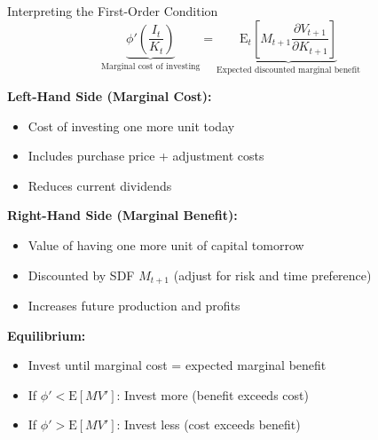 \documentclass{beamer}
\begin{document}
\begin{frame}[allowframebreaks]{Interpreting the First-Order Condition}
    \begin{equation*}
        \underbrace{\phi'\left(\frac{I_t}{K_t}\right)}_{\text{Marginal cost of investing}} = \underbrace{\mathrm{E}_t\left[M_{t+1} \frac{\partial V_{t+1}}{\partial K_{t+1}}\right]}_{\text{Expected discounted marginal benefit}}
    \end{equation*}
    
    
    \textbf{Left-Hand Side (Marginal Cost):}
    \begin{itemize}
        \item Cost of investing one more unit today
        \item Includes purchase price + adjustment costs
        \item Reduces current dividends
    \end{itemize}
    
    
    \textbf{Right-Hand Side (Marginal Benefit):}
    \begin{itemize}
        \item Value of having one more unit of capital tomorrow
        \item Discounted by SDF $M_{t+1}$ (adjust for risk and time preference)
        \item Increases future production and profits
    \end{itemize}
    
    
    \textbf{Equilibrium:}
    \begin{itemize}
        \item Invest until marginal cost = expected marginal benefit
        \item If $\phi' < \mathrm{E}[M V']$: Invest more (benefit exceeds cost)
        \item If $\phi' > \mathrm{E}[M V']$: Invest less (cost exceeds benefit)
    \end{itemize}
\end{frame}
\end{document}
